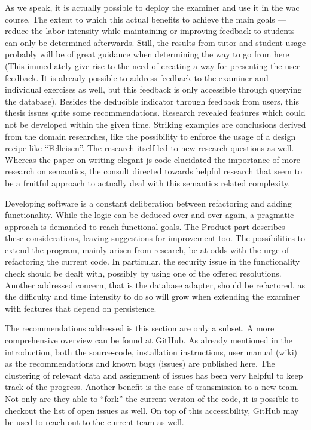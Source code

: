 As we speak, it is actually possible to deploy the \gls{examiner} and use it in 
the \gls{wac} course. The extent to which this actual benefits to achieve 
the main goals
--- reduce the labor intensity while maintaining or improving feedback to 
students --- can only be determined afterwards. Still, the results from 
\gls{tutor} and \gls{student} usage probably will be of great guidance when 
determining the way to go from here (This immediately give rise to the need of
creating a way for presenting the user feedback. It is already possible to
address feedback to the \gls{examiner} and individual \glspl{exercise} as well,
but this feedback is only accessible through querying the database).
Besides the deducible indicator through feedback from users, this 
thesis issues quite some recommendations. Research revealed
features which could not be developed within the given time. Striking
examples are conclusions derived from the domain researches, like the possibility
to enforce the usage of a design recipe like ``Felleisen''. The research itself
led to new research questions as well. Whereas the paper on writing elegant
\gls{js-code} elucidated the importance of more research on semantics, the
consult directed towards helpful research that seem to be a fruitful approach
to actually deal with this semantics related complexity.


Developing software is a constant deliberation between refactoring and adding
functionality. While the logic can be deduced over and over again, a pragmatic
approach is demanded to reach functional goals. The Product part describes these
considerations, leaving suggestions for improvement too. The possibilities to
extend the program, mainly arisen from research, be at odds with the urge of
refactoring the current code. In particular, the security issue in the 
functionality check should be dealt with, possibly by using one of the offered
resolutions. Another addressed concern, that is the database adapter, should be
refactored, as the difficulty and time intensity to do so will grow when extending
the \gls{examiner} with features that depend on persistence.


The recommendations addressed is this section are only a subset. A more 
comprehensive overview can be found at GitHub. As already mentioned in the 
introduction, both the \gls{source-code}, 
installation instructions, user manual (wiki) as the recommendations and known 
bugs (issues) are published here. The clustering of relevant data and assignment
of issues has been very helpful to keep track of the progress. Another benefit 
is the ease of transmission to a new team. Not only are they able to ``fork'' 
the current version of the code, it is possible to checkout the list of 
open issues as well. On top of this accessibility, GitHub may be used to reach
out to the current team as well.


